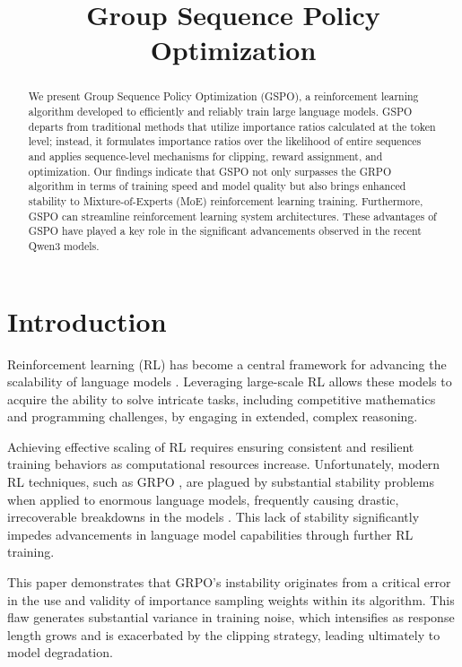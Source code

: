 \title{Group Sequence Policy Optimization}

\begin{abstract}
We present Group Sequence Policy Optimization (GSPO), a reinforcement learning algorithm developed to efficiently and reliably train large language models. GSPO departs from traditional methods that utilize importance ratios calculated at the token level; instead, it formulates importance ratios over the likelihood of entire sequences and applies sequence-level mechanisms for clipping, reward assignment, and optimization. Our findings indicate that GSPO not only surpasses the GRPO algorithm in terms of training speed and model quality but also brings enhanced stability to Mixture-of-Experts (MoE) reinforcement learning training. Furthermore, GSPO can streamline reinforcement learning system architectures. These advantages of GSPO have played a key role in the significant advancements observed in the recent Qwen3 models.
\end{abstract}

\section{Introduction}
\label{sec:intro}

Reinforcement learning (RL) has become a central framework for advancing the scalability of language models \citep{o1,dpsk-r1,qwq32b,qwen3}. Leveraging large-scale RL allows these models to acquire the ability to solve intricate tasks, including competitive mathematics and programming challenges, by engaging in extended, complex reasoning.

Achieving effective scaling of RL requires ensuring consistent and resilient training behaviors as computational resources increase. Unfortunately, modern RL techniques, such as GRPO \citep{grpo}, are plagued by substantial stability problems when applied to enormous language models, frequently causing drastic, irrecoverable breakdowns in the models \citep{qwen3, minimax-m1}. This lack of stability significantly impedes advancements in language model capabilities through further RL training.

This paper demonstrates that GRPO's instability originates from a critical error in the use and validity of importance sampling weights within its algorithm. This flaw generates substantial variance in training noise, which intensifies as response length grows and is exacerbated by the clipping strategy, leading ultimately to model degradation.

